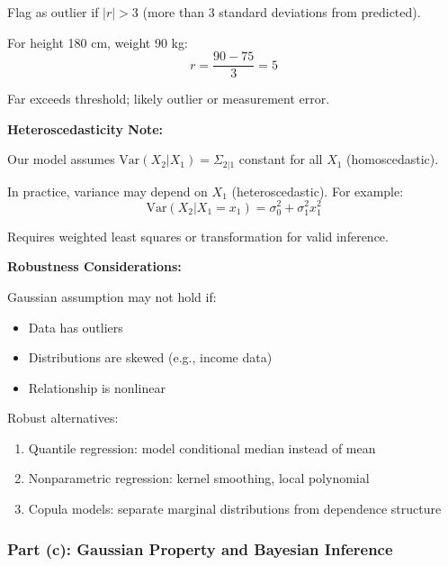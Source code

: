 \documentclass[12pt]{article}
\begin{document}
\begin{explanation}
Flag as outlier if $|r| > 3$ (more than 3 standard deviations from predicted).

For height 180 cm, weight 90 kg:
\[
r = \frac{90 - 75}{3} = 5
\]

Far exceeds threshold; likely outlier or measurement error.

\textbf{Heteroscedasticity Note:}

Our model assumes $\text{Var}(X_2 | X_1) = \Sigma_{2|1}$ constant for all $X_1$ (homoscedastic).

In practice, variance may depend on $X_1$ (heteroscedastic). For example:
\[
\text{Var}(X_2 | X_1 = x_1) = \sigma_0^2 + \sigma_1^2 x_1^2
\]

Requires weighted least squares or transformation for valid inference.

\textbf{Robustness Considerations:}

Gaussian assumption may not hold if:
\begin{itemize}
    \item Data has outliers
    \item Distributions are skewed (e.g., income data)
    \item Relationship is nonlinear
\end{itemize}

Robust alternatives:
\begin{enumerate}
    \item Quantile regression: model conditional median instead of mean
    \item Nonparametric regression: kernel smoothing, local polynomial
    \item Copula models: separate marginal distributions from dependence structure
\end{enumerate}

\end{explanation}

\subsubsection{Part (c): Gaussian Property and Bayesian Inference}
\end{document}

